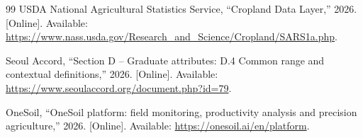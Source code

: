 \begin{thebibliography}{99}
USDA National Agricultural Statistics Service, ``Cropland Data Layer,'' 2026. [Online]. Available:
\url{https://www.nass.usda.gov/Research_and_Science/Cropland/SARS1a.php}.

Seoul Accord, ``Section D -- Graduate attributes: D.4 Common range and contextual definitions,''
2026. [Online]. Available: \url{https://www.seoulaccord.org/document.php?id=79}.

OneSoil, ``OneSoil platform: field monitoring, productivity analysis and precision agriculture,''
2026. [Online]. Available: \url{https://onesoil.ai/en/platform}.

\end{thebibliography}
